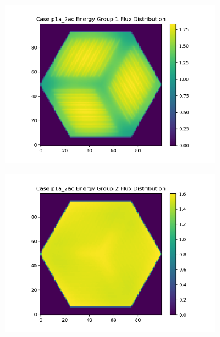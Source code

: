 \documentclass[letterpaper,11pt]{report}
\begin{document}
\begin{figure}[H]
      \begin{subfigure}{.33\textwidth}
        \centering
        \includegraphics[width=1.1\linewidth]{../../phase1a/case2ac/analysis_output/p1a_2ac_e_eg1.png}
        \caption{}
      \end{subfigure}%
      \begin{subfigure}{.33\textwidth}
        \centering
        \includegraphics[width=1.1\linewidth]{../../phase1a/case2ac/analysis_output/p1a_2ac_e_eg2.png}
        \caption{}
      \end{subfigure}
      \begin{subfigure}{.33\textwidth}
        \centering

\end{subfigure}
\end{figure}
\end{document}
